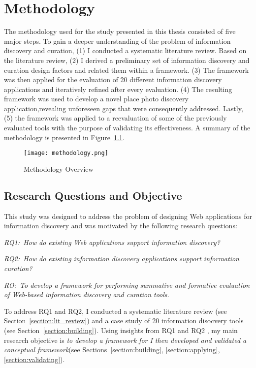 \chapter{Methodology}
\label{chapter:methodology}

The methodology used for the study presented in this thesis consisted of five major steps. To gain a deeper understanding of the problem of information discovery and curation, (1) I conducted a systematic literature review. Based on the literature review, (2) I derived a preliminary set of information discovery and curation design factors and related them within a framework. (3) The framework was then applied for the evaluation of 20 different information discovery applications and iteratively refined after every evaluation. (4) The resulting framework was used to develop a novel place photo discovery application,revealing unforeseen gaps that were consequently addressed. Lastly, (5) the framework was applied to a reevaluation of some of the previously evaluated tools with the purpose of validating its effectiveness.  A summary of the methodology is presented in Figure~\ref{fig:methodology}.
\begin{figure}[ht!]
	\noindent
	\centering
	\texttt{[image: methodology.png]}
	\caption{Methodology Overview}
	\label{fig:methodology} 
\end{figure}

{\section{Research Questions and Objective}
This study was designed to address the problem of designing Web applications for information discovery and was motivated by the following research questions:

\emph{RQ1:~How do existing Web applications support information discovery?}

\emph{RQ2:~How do existing information discovery applications support information curation?}

\emph{RO:~To develop a framework for performing summative and formative evaluation of Web-based information discovery and curation tools.}


\pagebreak

To address RQ1 and RQ2, I conducted a systematic literature review (see Section~\ref{section:lit_review}) and a case study of 20 information disocvery tools (see Section~\ref{section:building}). Using insights from RQ1 and RQ2 , my main research objective is \textit{to develop a framework for I then developed and validated a conceptual framework}(see Sections~\ref{section:building}, \ref{section:applying}, \ref{section:validating}). 
}%

